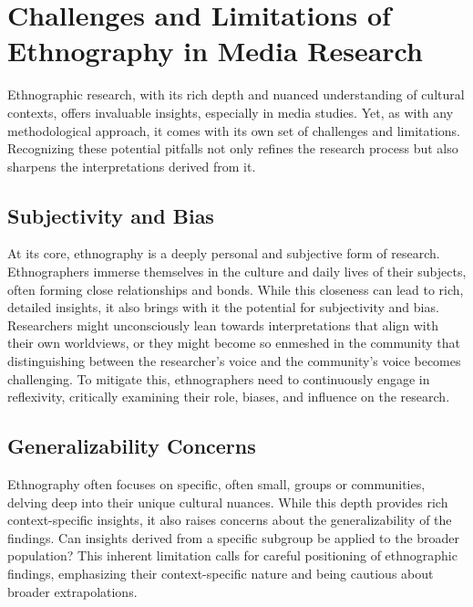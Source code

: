 \documentclass[
  b5paper]{book}
\begin{document}
\hypertarget{challenges-and-limitations-of-ethnography-in-media-research}{%
\section{Challenges and Limitations of Ethnography in Media Research}\label{challenges-and-limitations-of-ethnography-in-media-research}}

Ethnographic research, with its rich depth and nuanced understanding of cultural contexts, offers invaluable insights, especially in media studies. Yet, as with any methodological approach, it comes with its own set of challenges and limitations. Recognizing these potential pitfalls not only refines the research process but also sharpens the interpretations derived from it.

\hypertarget{subjectivity-and-bias}{%
\subsection*{Subjectivity and Bias}\label{subjectivity-and-bias}}

At its core, ethnography is a deeply personal and subjective form of research. Ethnographers immerse themselves in the culture and daily lives of their subjects, often forming close relationships and bonds. While this closeness can lead to rich, detailed insights, it also brings with it the potential for subjectivity and bias. Researchers might unconsciously lean towards interpretations that align with their own worldviews, or they might become so enmeshed in the community that distinguishing between the researcher's voice and the community's voice becomes challenging. To mitigate this, ethnographers need to continuously engage in reflexivity, critically examining their role, biases, and influence on the research.

\hypertarget{generalizability-concerns}{%
\subsection*{Generalizability Concerns}\label{generalizability-concerns}}

Ethnography often focuses on specific, often small, groups or communities, delving deep into their unique cultural nuances. While this depth provides rich context-specific insights, it also raises concerns about the generalizability of the findings. Can insights derived from a specific subgroup be applied to the broader population? This inherent limitation calls for careful positioning of ethnographic findings, emphasizing their context-specific nature and being cautious about broader extrapolations.
\end{document}
